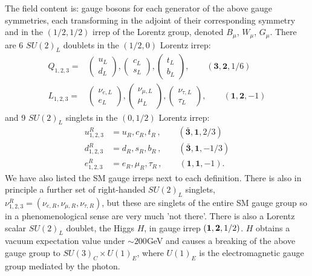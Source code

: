 The field content is: gauge bosons for each generator of the above gauge symmetries, each transforming in the adjoint of their corresponding symmetry and in the $(1/2,1/2)$ irrep of the Lorentz group, denoted $B_{\mu}$, $W_{\mu}$, $G_{\mu}$. There are 6 $SU(2)_L$ doublets in the $(1/2,0)$ Lorentz irrep:
\begin{align}
  Q_{1,2,3} =&
  \begin{pmatrix} u_L \\ d_L \end{pmatrix},
  \begin{pmatrix} c_L \\ s_L \end{pmatrix},
  \begin{pmatrix} t_L \\ b_L \end{pmatrix}
  ,\quad\quad
  (\mathbf{3},\mathbf{2},1/6) \\
  L_{1,2,3} =&
  \begin{pmatrix} \nu_{e,L} \\ e_L \end{pmatrix},
  \begin{pmatrix} \nu_{\mu,L} \\ \mu_L \end{pmatrix},
  \begin{pmatrix} \nu_{\tau,L} \\ \tau_L \end{pmatrix}
  ,\quad\quad
  (\mathbf{1},\mathbf{2},-1)
\end{align}
and 9 $SU(2)_L$ singlets in the $(0,1/2)$ Lorentz irrep:
\begin{align}
  u^R_{1,2,3} &= u_R, c_R, t_R\,,\quad\quad (\bar{\mathbf{3}},\mathbf{1},2/3) \\
  d^R_{1,2,3} &= d_R, s_R, b_R\,,\quad\quad (\bar{\mathbf{3}},\mathbf{1},-1/3) \\
  e^R_{1,2,3} &= e_R, \mu_R, \tau_R\,,\quad\quad (\mathbf{1},\mathbf{1},-1).
\end{align}
We have also listed the SM gauge irreps next to each definition. There is also in principle a further set of right-handed $SU(2)_L$ singlets, $\nu^R_{1,2,3} = (\nu_{e,R}, \nu_{\mu,R}, \nu_{\tau,R})$, but these are singlets of the entire SM gauge group so in a phenomenological sense are very much 'not there'. There is also a Lorentz scalar $SU(2)_L$ doublet, the Higgs $H$, in gauge irrep $({\bf{1}},{\bf{2}},1/2)$. $H$ obtains a vacuum expectation value under $\sim 200$GeV and causes a breaking of the above gauge group to $SU(3)_C\times U(1)_E$, where $U(1)_E$ is the electromagnetic gauge group mediated by the photon.
